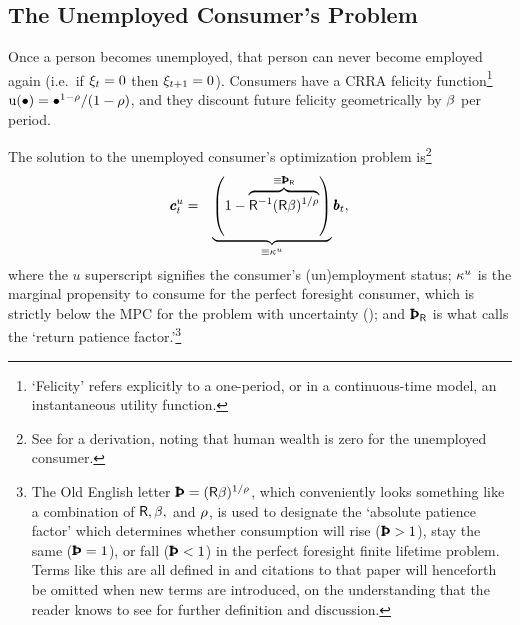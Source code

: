 \documentclass{handout}
\begin{document}
\pagebreak 
\subsection{The Unemployed Consumer's Problem} \label{subsec:Fred}

Once a person becomes unemployed, that person can never become
employed again (i.e.\ if $\xi_{t}=0$ then $\xi_{t+1}=0$).
Consumers have a CRRA felicity function\footnote{`Felicity' refers explicitly to a one-period, or in a continuous-time model, an instantaneous utility function.}  ${\mathrm{u}}(\bullet)=
\bullet^{1-\rho}/(1-\rho)$, and they discount future felicity
geometrically by $\beta$ per period.


The solution to the unemployed consumer's optimization problem
is\footnote{See  for a derivation, noting that human wealth is zero for the unemployed consumer.} 
\begin{eqnarray}
        \cLevU_{t} & = & \underbrace{\left(1-\overbrace{\Rfree ^{-1}(\Rfree{\Discount})^{1/\CRRA}}^{\equiv \PatR}\right)}_{\equiv \MPCU} \bLev_{t} \label{eq:cpfinfhorunemp} \label{eq:cdel} \label{eq:kappaDef}
,
\end{eqnarray}
where the $u$ superscript signifies the consumer's (un)employment
status; $\kappa^{u}$ is the marginal propensity to consume for the perfect
foresight consumer, which is strictly below the MPC for the problem
with uncertainty (\cite{carroll&kimball:concavity}); and $\PatR$ is
what \cite{carrollBSTheory} calls the `return patience factor.'\footnote{The Old English letter $\Pat = (\Rfree \Discount)^{1/\CRRA}$, which conveniently looks something like a combination of $\mathsf{R}, \beta, $ and $\rho$, is used to designate the `absolute patience factor' which determines whether consumption will rise ($\Pat > 1$), stay the same ($\Pat = 1$), or fall ($\Pat < 1$) in the perfect foresight finite lifetime problem.  Terms like this are all defined in \cite{carrollBSTheory} and citations to that paper will henceforth be omitted when new terms are introduced, on the understanding that the reader knows to see \cite{carrollBSTheory} for further definition and discussion.}
\end{document}
